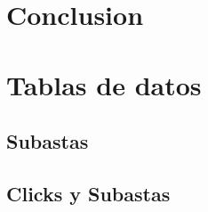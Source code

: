 \documentclass[a4paper, 12pt]{article}
\begin{document}
\section{Conclusion}

\clearpage
\appendix
\section{Tablas de datos}
	\subsection{Subastas}
	

	\subsection{Clicks y Subastas}
	
\clearpage



\end{document}

